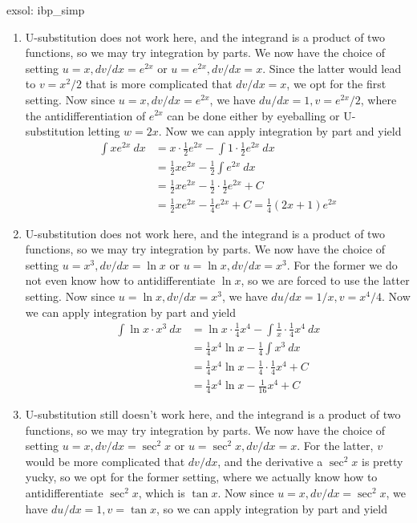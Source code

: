 \begin{exsol}[]{exsol: ibp_simp}
    \begin{enumerate}
        \item U-substitution does not work here, and the integrand is a product of two functions, so we may try integration by parts.  We now have the choice of setting $u = x, dv/dx = e^{2x}$ or $u = e^{2x}, dv/dx = x$.  Since the latter would lead to $v = x^2/2$ that is more complicated that $dv/dx = x$, we opt for the first setting.  Now since $u = x, dv/dx = e^{2x}$, we have $du/dx = 1, v = e^{2x}/2$, where the antidifferentiation of $e^{2x}$ can be done either by eyeballing or U-substitution letting $w = 2x$.  Now we can apply integration by part and yield
        \begin{align*}
            \int xe^{2x}~dx &= x \cdot \frac{1}{2}e^{2x} - \int 1 \cdot \frac{1}{2}e^{2x}~dx\\
            &= \frac{1}{2}xe^{2x} - \frac{1}{2}\int e^{2x}~dx\\
            &= \frac{1}{2}xe^{2x} - \frac{1}{2}\cdot\frac{1}{2}e^{2x} + C\\
            &= \frac{1}{2}xe^{2x} - \frac{1}{4}e^{2x} + C = \frac{1}{4}(2x+1)e^{2x}
        \end{align*}
        \item U-substitution does not work here, and the integrand is a product of two functions, so we may try integration by parts.  We now have the choice of setting $u = x^3, dv/dx = \ln x$ or $u = \ln x, dv/dx = x^3$.  For the former we do not even know how to antidifferentiate $\ln x$, so we are forced to use the latter setting.  Now since $u = \ln x, dv/dx = x^3$, we have $du/dx = 1/x, v = x^4/4$.  Now we can apply integration by part and yield
        \begin{align*}
            \int \ln x \cdot x^3~dx &= \ln x \cdot \frac{1}{4}x^4 - \int \frac{1}{x} \cdot \frac{1}{4}x^4~dx\\
            &= \frac{1}{4}x^4\ln x - \frac{1}{4}\int x^3~dx\\
            &= \frac{1}{4}x^4\ln x - \frac{1}{4}\cdot \frac{1}{4}x^4 + C\\
            &= \frac{1}{4}x^4\ln x - \frac{1}{16}x^4 + C
        \end{align*}
        \item U-substitution still doesn't work here, and the integrand is a product of two functions, so we may try integration by parts.  We now have the choice of setting $u = x, dv/dx = \sec^2 x$ or $u = \sec^2 x, dv/dx = x$.  For the latter, $v$ would be more complicated that $dv/dx$, and the derivative a $\sec^2 x$ is pretty yucky, so we opt for the former setting, where we actually know how to antidifferentiate $\sec^2 x$, which is $\tan x$.  Now since $u = x, dv/dx = \sec^2 x$, we have $du/dx = 1, v = \tan x$, so we can apply integration by part and yield

\end{enumerate}
\end{exsol}
